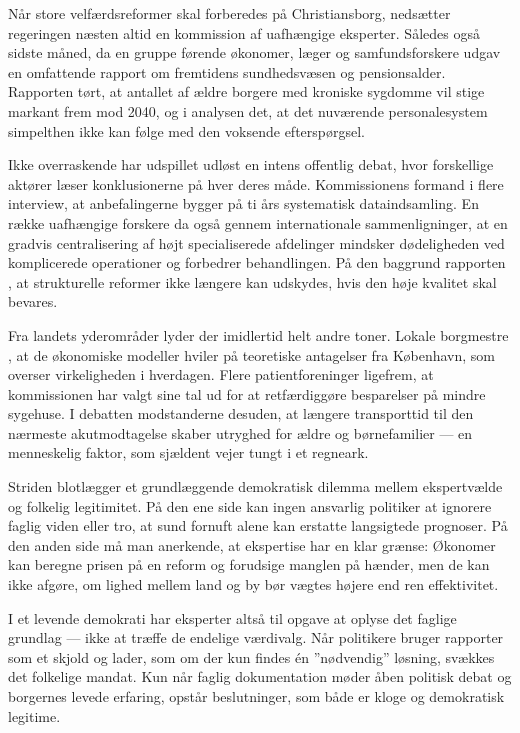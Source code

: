 Når store velfærdsreformer skal forberedes på Christiansborg, nedsætter regeringen næsten altid en kommission af uafhængige eksperter. Således også sidste måned, da en gruppe førende økonomer, læger og samfundsforskere udgav en omfattende rapport om fremtidens sundhedsvæsen og pensionsalder. Rapporten  tørt, at antallet af ældre borgere med kroniske sygdomme vil stige markant frem mod 2040, og i analysen  det, at det nuværende personalesystem simpelthen ikke kan følge med den voksende efterspørgsel.

Ikke overraskende har udspillet udløst en intens offentlig debat, hvor forskellige aktører læser konklusionerne på hver deres måde. Kommissionens formand  i flere interview, at anbefalingerne bygger på ti års systematisk dataindsamling. En række uafhængige forskere  da også gennem internationale sammenligninger, at en gradvis centralisering af højt specialiserede afdelinger mindsker dødeligheden ved komplicerede operationer og forbedrer behandlingen. På den baggrund  rapporten , at strukturelle reformer ikke længere kan udskydes, hvis den høje kvalitet skal bevares.

Fra landets yderområder lyder der imidlertid helt andre toner. Lokale borgmestre , at de økonomiske modeller hviler på teoretiske antagelser fra København, som overser virkeligheden i hverdagen. Flere patientforeninger  ligefrem, at kommissionen har valgt sine tal ud for at retfærdiggøre besparelser på mindre sygehuse. I debatten  modstanderne desuden, at længere transporttid til den nærmeste akutmodtagelse skaber utryghed for ældre og børnefamilier --- en menneskelig faktor, som sjældent vejer tungt i et regneark.

Striden blotlægger et grundlæggende demokratisk dilemma mellem ekspertvælde og folkelig legitimitet. På den ene side kan ingen ansvarlig politiker  at ignorere faglig viden eller tro, at sund fornuft alene kan erstatte langsigtede prognoser. På den anden side må man anerkende, at ekspertise har en klar grænse: Økonomer kan beregne prisen på en reform og forudsige manglen på hænder, men de kan ikke afgøre, om lighed mellem land og by bør vægtes højere end ren effektivitet.

I et levende demokrati har eksperter altså til opgave at oplyse det faglige grundlag --- ikke at træffe de endelige værdivalg. Når politikere bruger rapporter som et skjold og lader, som om der kun findes én ”nødvendig” løsning, svækkes det folkelige mandat. Kun når faglig dokumentation møder åben politisk debat og borgernes levede erfaring, opstår beslutninger, som både er kloge og demokratisk legitime.

